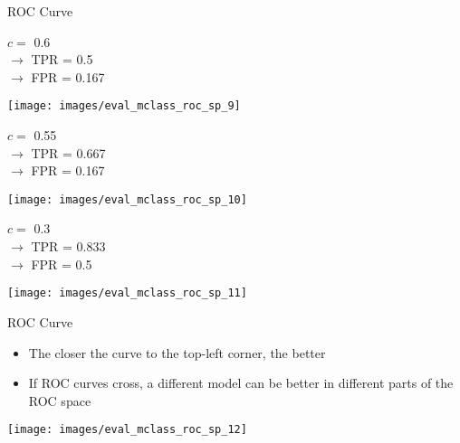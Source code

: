 \documentclass[11pt,compress,t,notes=noshow, xcolor=table]{beamer}
\newenvironment{knitrout}{}{} %
\begin{document}
\begin{vbframe}{ROC Curve}
\begin{knitrout}
\end{knitrout}

$c =$ 0.6\\ 
$\rightarrow$ TPR = 0.5 \\
$\rightarrow$ FPR = 0.167


\framebreak

\begin{knitrout}\scriptsize
{}\color{fgcolor}

{\centering \texttt{[image: images/eval\_mclass\_roc\_sp\_9]} 

}



\end{knitrout}

$c =$ 0.55\\ 
$\rightarrow$ TPR = 0.667 \\
$\rightarrow$ FPR = 0.167

\framebreak

\begin{knitrout}\scriptsize
{}\color{fgcolor}

{\centering \texttt{[image: images/eval\_mclass\_roc\_sp\_10]} 

}



\end{knitrout}

$c =$ 0.3\\ 
$\rightarrow$ TPR = 0.833 \\
$\rightarrow$ FPR = 0.5

\framebreak

\begin{knitrout}\scriptsize
{}\color{fgcolor}

{\centering \texttt{[image: images/eval\_mclass\_roc\_sp\_11]} 

}



\end{knitrout}

\end{vbframe}

\begin{vbframe}{ROC Curve}
\begin{itemize}
  \item The closer the curve to the top-left corner, the better
  \item If ROC curves cross, a different model can be better in different parts of the ROC space
\end{itemize}
\begin{knitrout}\scriptsize
{}\color{fgcolor}

{\centering \texttt{[image: images/eval\_mclass\_roc\_sp\_12]} 

}



\end{knitrout}
\end{vbframe}
\end{document}

